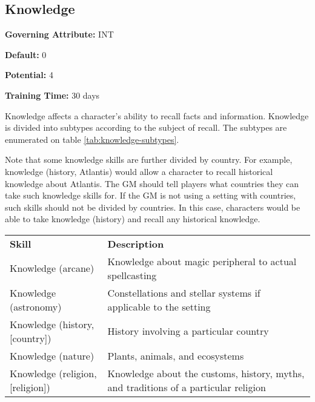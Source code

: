 \subsection{Knowledge}\label{skill:knowledge}

\noindent
\textbf{Governing Attribute:} INT

\noindent
\textbf{Default:} 0

\noindent
\textbf{Potential:} 4

\noindent
\textbf{Training Time:} 30 days


Knowledge affects a character's ability to recall facts and information.
Knowledge is divided into subtypes according to the subject of recall. The
subtypes are enumerated on table \ref{tab:knowledge-subtypes}.

Note that some knowledge skills are further divided by country. For example,
knowledge (history, Atlantis) would allow a character to recall historical
knowledge about Atlantis. The GM should tell players what countries they can
take such knowledge skills for. If the GM is not using a setting with
countries, such skills should not be divided by countries. In this case,
characters would be able to take knowledge (history) and recall any historical
knowledge.

\begin{center}
    \unclassedrowcolors
    \begin{tabularx}{0.5\textwidth}{X X}
        \textbf{Skill} & \textbf{Description} \\
        Knowledge (arcane) & Knowledge about magic peripheral to actual spellcasting \\
        Knowledge (astronomy) & Constellations and stellar systems if applicable to the setting \\
        Knowledge (history, [country]) & History involving a particular country \\
        Knowledge (nature) & Plants, animals, and ecosystems \\
        Knowledge (religion, [religion]) & Knowledge about the customs, history, myths, and traditions of a particular religion \\
    \end{tabularx}
    \label{tab:knowledge-subtypes}
\end{center}

